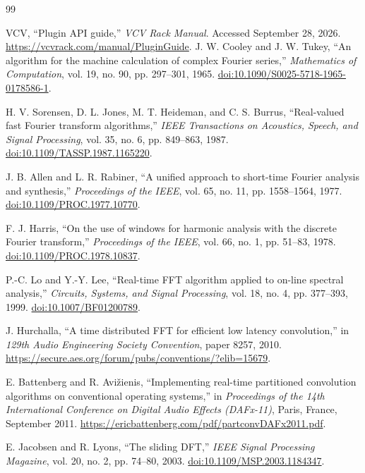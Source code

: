 \begin{thebibliography}{99}
\small\raggedright
{}
VCV, ``Plugin API guide,'' \emph{VCV Rack Manual}. Accessed September 28, 2026.
\url{https://vcvrack.com/manual/PluginGuide}.
J. W. Cooley and J. W. Tukey, ``An algorithm for the machine calculation of
complex Fourier series,'' \emph{Mathematics of Computation}, vol. 19, no. 90,
pp. 297--301, 1965. \href{https://doi.org/10.1090/S0025-5718-1965-0178586-1}{doi:10.1090/S0025-5718-1965-0178586-1}.

H. V. Sorensen, D. L. Jones, M. T. Heideman, and C. S. Burrus,
``Real-valued fast Fourier transform algorithms,'' \emph{IEEE Transactions
on Acoustics, Speech, and Signal Processing}, vol. 35, no. 6, pp. 849--863,
1987. \href{https://doi.org/10.1109/TASSP.1987.1165220}{doi:10.1109/TASSP.1987.1165220}.

J. B. Allen and L. R. Rabiner, ``A unified approach to short-time Fourier
analysis and synthesis,'' \emph{Proceedings of the IEEE}, vol. 65, no. 11,
pp. 1558--1564, 1977.
\href{https://doi.org/10.1109/PROC.1977.10770}{doi:10.1109/PROC.1977.10770}.

F. J. Harris, ``On the use of windows for harmonic analysis with the discrete
Fourier transform,'' \emph{Proceedings of the IEEE}, vol. 66, no. 1,
pp. 51--83, 1978.
\href{https://doi.org/10.1109/PROC.1978.10837}{doi:10.1109/PROC.1978.10837}.

P.-C. Lo and Y.-Y. Lee, ``Real-time FFT algorithm applied to on-line spectral
analysis,'' \emph{Circuits, Systems, and Signal Processing}, vol. 18, no. 4,
pp. 377--393, 1999.
\href{https://doi.org/10.1007/BF01200789}{doi:10.1007/BF01200789}.

J. Hurchalla, ``A time distributed FFT for efficient low latency convolution,''
in \emph{129th Audio Engineering Society Convention}, paper 8257, 2010.
\url{https://secure.aes.org/forum/pubs/conventions/?elib=15679}.

E. Battenberg and R. Avi\v{z}ienis, ``Implementing real-time partitioned
convolution algorithms on conventional operating systems,'' in
\emph{Proceedings of the 14th International Conference on Digital Audio
Effects (DAFx-11)}, Paris, France, September 2011.
\url{https://ericbattenberg.com/pdf/partconvDAFx2011.pdf}.

E. Jacobsen and R. Lyons, ``The sliding DFT,'' \emph{IEEE Signal Processing
Magazine}, vol. 20, no. 2, pp. 74--80, 2003.
\href{https://doi.org/10.1109/MSP.2003.1184347}{doi:10.1109/MSP.2003.1184347}.


\end{thebibliography}
